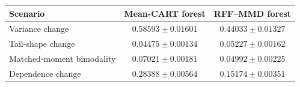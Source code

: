 \begin{tabular}{@{}lcc@{}}
\toprule
Scenario & Mean-CART forest & RFF--MMD forest \\
\midrule
Variance change & $0.58593\pm 0.01601$ & $0.44033\pm 0.01327$ \\
Tail-shape change & $0.04475\pm 0.00134$ & $0.05227\pm 0.00162$ \\
Matched-moment bimodality & $0.07021\pm 0.00181$ & $0.04992\pm 0.00225$ \\
Dependence change & $0.28388\pm 0.00564$ & $0.15174\pm 0.00351$ \\
\bottomrule
\end{tabular}
